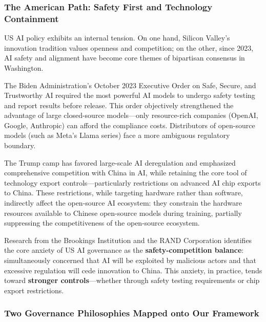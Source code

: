 ﻿\documentclass[12pt,a4paper]{article}
\begin{document}
\subsubsection{The American Path: Safety First and Technology Containment}

US AI policy exhibits an internal tension. On one hand, Silicon Valley's innovation tradition values openness and competition; on the other, since 2023, AI safety and alignment have become core themes of bipartisan consensus in Washington.

The Biden Administration's October 2023 Executive Order on Safe, Secure, and Trustworthy AI required the most powerful AI models to undergo safety testing and report results before release. This order objectively strengthened the advantage of large closed-source models---only resource-rich companies (OpenAI, Google, Anthropic) can afford the compliance costs. Distributors of open-source models (such as Meta's Llama series) face a more ambiguous regulatory boundary.

The Trump camp has favored large-scale AI deregulation and emphasized comprehensive competition with China in AI, while retaining the core tool of technology export controls---particularly restrictions on advanced AI chip exports to China. These restrictions, while targeting hardware rather than software, indirectly affect the open-source AI ecosystem: they constrain the hardware resources available to Chinese open-source models during training, partially suppressing the competitiveness of the open-source ecosystem.

Research from the Brookings Institution and the RAND Corporation identifies the core anxiety of US AI governance as the \textbf{safety-competition balance}: simultaneously concerned that AI will be exploited by malicious actors and that excessive regulation will cede innovation to China. This anxiety, in practice, tends toward \textbf{stronger controls}---whether through safety testing requirements or chip export restrictions.

\subsubsection{Two Governance Philosophies Mapped onto Our Framework}
\end{document}

